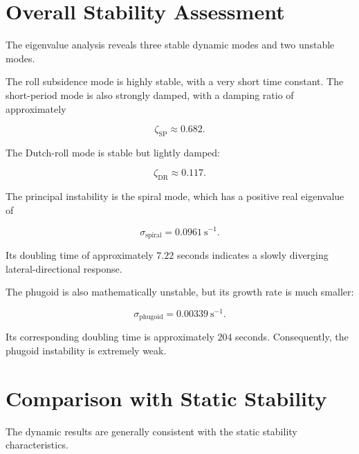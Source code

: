 \documentclass[11pt,a4paper]{article}
\begin{document}
\section{Overall Stability Assessment}

The eigenvalue analysis reveals three stable dynamic modes and two
unstable modes.

The roll subsidence mode is highly stable, with a very short time
constant. The short-period mode is also strongly damped, with a damping
ratio of approximately

\begin{equation}
\zeta_{\mathrm{SP}}\approx0.682.
\end{equation}

The Dutch-roll mode is stable but lightly damped:

\begin{equation}
\zeta_{\mathrm{DR}}\approx0.117.
\end{equation}

The principal instability is the spiral mode, which has a positive real
eigenvalue of

\begin{equation}
\sigma_{\mathrm{spiral}}
=
0.0961~\mathrm{s^{-1}}.
\end{equation}

Its doubling time of approximately $7.22$ seconds indicates a slowly
diverging lateral-directional response.

The phugoid is also mathematically unstable, but its growth rate is much
smaller:

\begin{equation}
\sigma_{\mathrm{phugoid}}
=
0.00339~\mathrm{s^{-1}}.
\end{equation}

Its corresponding doubling time is approximately $204$ seconds.
Consequently, the phugoid instability is extremely weak.

\section{Comparison with Static Stability}

The dynamic results are generally consistent with the static stability
characteristics.
\end{document}
